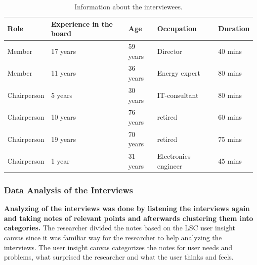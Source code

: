 \begin{table}
\begin{tabular}{|p{2.3cm}|p{2.8cm}|p{1.8cm}|p{2.7cm}|p{1.9cm}|} 
\hline %
\textbf{Role} & \raggedright\textbf{Experience in the board} & \textbf{Age} & \textbf{Occupation} & \textbf{Duration} \\ 
\hline 
Member & 17 years & 59 years & Director & 40 mins \\ 
\hline
Member & 11 years & 36 years & Energy expert & 80 mins \\  
\hline
Chairperson & 5 years & 30 years & IT-consultant & 80 mins \\
\hline
Chairperson & 10 years & 76 years & retired & 60 mins \\
\hline
Chairperson & 19 years & 70 years & retired & 75 mins \\
\hline
Chairperson & 1 year & 31 years & Electronics engineer & 45 mins \\
\hline
\end{tabular} %
\caption{Information about the interviewees.}
\label{table:interviewtb}
\end{table} %

\subsubsection*{Data Analysis of the Interviews}

\textbf{Analyzing of the interviews was done by listening the interviews again and taking notes of relevant points and afterwards clustering them into categories.} The researcher divided the notes based on the LSC user insight canvas since it was familiar way for the researcher to help analyzing the interviews. The user insight canvas categorizes the notes for user needs and problems, what surprised the researcher and what the user thinks and feels.


